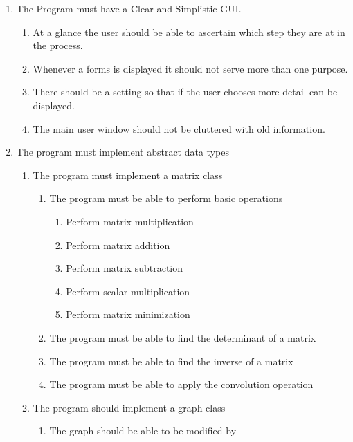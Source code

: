 \begin{FlushLeft}
\begin{enumerate}
            \item The Program must have a Clear and Simplistic GUI.
            \begin{enumerate}
                \item At a glance the user should be able to ascertain which step they are at in the process.
                \item Whenever a forms is displayed it should not serve more than one purpose.
                \item There should be a setting so that if the user chooses more detail can be displayed.
                \item The main user window should not be cluttered with old information.
            \end{enumerate}          

            \item The program must implement abstract data types
            \begin{enumerate}
                \item The program must implement a matrix class
                \begin{enumerate}
                    \item The program must be able to perform basic operations
                    \begin{enumerate}
                        \item Perform matrix multiplication
                        \item Perform matrix addition
                        \item Perform matrix subtraction
                        \item Perform scalar multiplication
                        \item Perform matrix minimization
                \end{enumerate}
                \item The program must be able to find the determinant of a matrix
                \item The program must be able to find the inverse of a matrix
                \item The program must be able to apply the convolution operation
                \end{enumerate}
                \item The program should implement a graph class
                \begin{enumerate}
                    \item The graph should be able to be modified by

\end{enumerate}
\end{enumerate}
\end{enumerate}
\end{FlushLeft}
